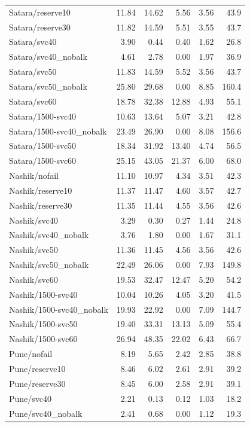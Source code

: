 \documentclass[11pt,a4paper,oneside]{report}
\begin{document}
\begin{center}
\begin{longtable}{p{5cm}rrrrr}
Satara/reserve10 & 11.84 & 14.62 & 5.56 & 3.56 & 43.9\\
Satara/reserve30 & 11.82 & 14.59 & 5.51 & 3.55 & 43.7\\
Satara/svc40 & 3.90 & 0.44 & 0.40 & 1.62 & 26.8\\
Satara/svc40\_nobalk & 4.61 & 2.78 & 0.00 & 1.97 & 36.9\\
Satara/svc50 & 11.83 & 14.59 & 5.52 & 3.56 & 43.7\\
Satara/svc50\_nobalk & 25.80 & 29.68 & 0.00 & 8.85 & 160.4\\
Satara/svc60 & 18.78 & 32.38 & 12.88 & 4.93 & 55.1\\
Satara/1500-svc40 & 10.63 & 13.64 & 5.07 & 3.21 & 42.8\\
Satara/1500-svc40\_nobalk & 23.49 & 26.90 & 0.00 & 8.08 & 156.6\\
Satara/1500-svc50 & 18.34 & 31.92 & 13.40 & 4.74 & 56.5\\
Satara/1500-svc60 & 25.15 & 43.05 & 21.37 & 6.00 & 68.0\\
Nashik/nofail & 11.10 & 10.97 & 4.34 & 3.51 & 42.3\\
Nashik/reserve10 & 11.37 & 11.47 & 4.60 & 3.57 & 42.7\\
Nashik/reserve30 & 11.35 & 11.44 & 4.55 & 3.56 & 42.6\\
Nashik/svc40 & 3.29 & 0.30 & 0.27 & 1.44 & 24.8\\
Nashik/svc40\_nobalk & 3.76 & 1.80 & 0.00 & 1.67 & 31.1\\
Nashik/svc50 & 11.36 & 11.45 & 4.56 & 3.56 & 42.6\\
Nashik/svc50\_nobalk & 22.49 & 26.06 & 0.00 & 7.93 & 149.8\\
Nashik/svc60 & 19.53 & 32.47 & 12.47 & 5.20 & 54.2\\
Nashik/1500-svc40 & 10.04 & 10.26 & 4.05 & 3.20 & 41.5\\
Nashik/1500-svc40\_nobalk & 19.93 & 22.92 & 0.00 & 7.09 & 144.7\\
Nashik/1500-svc50 & 19.40 & 33.31 & 13.13 & 5.09 & 55.4\\
Nashik/1500-svc60 & 26.94 & 48.35 & 22.02 & 6.43 & 66.7\\
Pune/nofail & 8.19 & 5.65 & 2.42 & 2.85 & 38.8\\
Pune/reserve10 & 8.46 & 6.02 & 2.61 & 2.91 & 39.2\\
Pune/reserve30 & 8.45 & 6.00 & 2.58 & 2.91 & 39.1\\
Pune/svc40 & 2.21 & 0.13 & 0.12 & 1.03 & 18.2\\
Pune/svc40\_nobalk & 2.41 & 0.68 & 0.00 & 1.12 & 19.3\\

\end{longtable}
\end{center}
\end{document}
